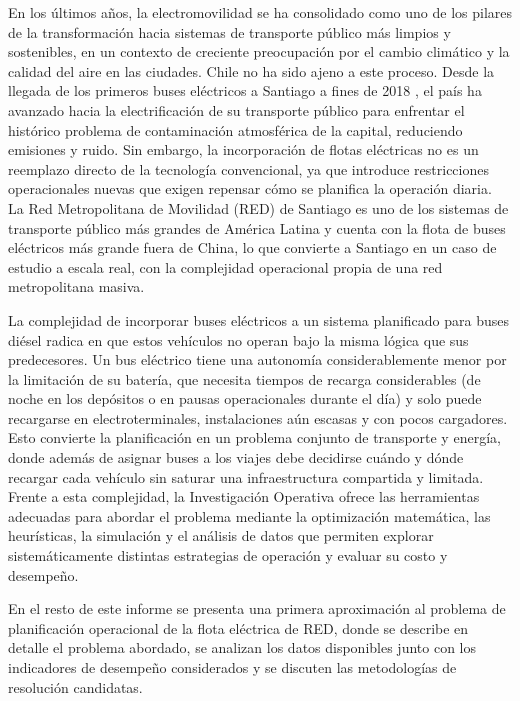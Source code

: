 En los \'ultimos a\~nos, la electromovilidad se ha consolidado como uno de los pilares de la transformaci\'on hacia sistemas de transporte p\'ublico m\'as limpios y sostenibles, en un contexto de creciente preocupaci\'on por el cambio clim\'atico y la calidad del aire en las ciudades. Chile no ha sido ajeno a este proceso. Desde la llegada de los primeros buses el\'ectricos a Santiago a fines de 2018 \cite{worldbank2020}, el pa\'is ha avanzado hacia la electrificaci\'on de su transporte p\'ublico para enfrentar el hist\'orico problema de contaminaci\'on atmosf\'erica de la capital, reduciendo emisiones y ruido. Sin embargo, la incorporaci\'on de flotas el\'ectricas no es un reemplazo directo de la tecnolog\'ia convencional, ya que introduce restricciones operacionales nuevas que exigen repensar c\'omo se planifica la operaci\'on diaria. La Red Metropolitana de Movilidad (RED) de Santiago es uno de los sistemas de transporte p\'ublico m\'as grandes de Am\'erica Latina y cuenta con la flota de buses el\'ectricos m\'as grande fuera de China, lo que convierte a Santiago en un caso de estudio a escala real, con la complejidad operacional propia de una red metropolitana masiva.

La complejidad de incorporar buses el\'ectricos a un sistema planificado para buses di\'esel radica en que estos veh\'iculos no operan bajo la misma l\'ogica que sus predecesores. Un bus el\'ectrico tiene una autonom\'ia considerablemente menor por la limitaci\'on de su bater\'ia, que necesita tiempos de recarga considerables (de noche en los dep\'ositos o en pausas operacionales durante el d\'ia) y solo puede recargarse en electroterminales, instalaciones a\'un escasas y con pocos cargadores. Esto convierte la planificaci\'on en un problema conjunto de transporte y energ\'ia, donde adem\'as de asignar buses a los viajes debe decidirse cu\'ando y d\'onde recargar cada veh\'iculo sin saturar una infraestructura compartida y limitada. Frente a esta complejidad, la Investigaci\'on Operativa ofrece las herramientas adecuadas para abordar el problema mediante la optimizaci\'on matem\'atica, las heur\'isticas, la simulaci\'on y el an\'alisis de datos que permiten explorar sistem\'aticamente distintas estrategias de operaci\'on y evaluar su costo y desempe\~no.

En el resto de este informe se presenta una primera aproximaci\'on al problema de planificaci\'on operacional de la flota el\'ectrica de RED, donde se describe en detalle el problema abordado, se analizan los datos disponibles junto con los indicadores de desempe\~no considerados y se discuten las metodolog\'ias de resoluci\'on candidatas.
